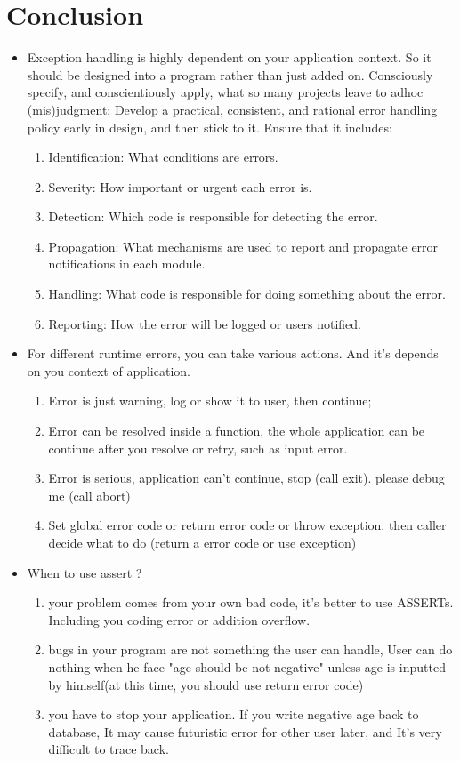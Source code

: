 \documentclass[a4paper,11pt,twoside]{book}
\begin{document}
\section{Conclusion}
\begin{itemize}
	\item Exception handling is highly dependent on your application context. So it should be designed into a program rather than just added on. Consciously specify, and conscientiously apply, what so many projects leave to adhoc (mis)judgment: Develop a practical, consistent, and rational error handling policy early in design, and then stick to it. Ensure that it includes:
	
	\begin{enumerate}
		\item Identification: What conditions are errors.
		\item Severity: How important or urgent each error is.
		\item Detection: Which code is responsible for detecting the error.
		\item Propagation: What mechanisms are used to report and propagate error
		notifications in each module.
		\item Handling: What code is responsible for doing something about the error.
		\item Reporting: How the error will be logged or users notified.
	\end{enumerate}
	
	
	\item For different runtime errors, you can take various actions. And it's depends on you context of application.
	
	\begin{enumerate}
		\item Error is just warning, log or show it to user, then continue;
		\item Error can be resolved inside a function, the whole application can be continue after you resolve or retry, such as input error.
		\item Error is serious, application can't continue, stop (call exit).  please debug me (call abort)
		\item Set global error code or return error code or throw exception. then caller decide what to do (return a error code or use exception)
	\end{enumerate}
	
	
	\item When to use assert ?
	\begin{enumerate}
		\item your problem comes from your own bad code, it's better to use ASSERTs.  Including you coding error or addition overflow.
		\item bugs in your program are not something the user can handle, User can do nothing when he face "age should be not negative" unless age is inputted by himself(at this time, you should use return error code)
		\item you have to stop your application. If you write negative age back to database, It may cause futuristic error for other user later, and It's very difficult to trace back.
	\end{enumerate}
	

\end{itemize}
\end{document}
